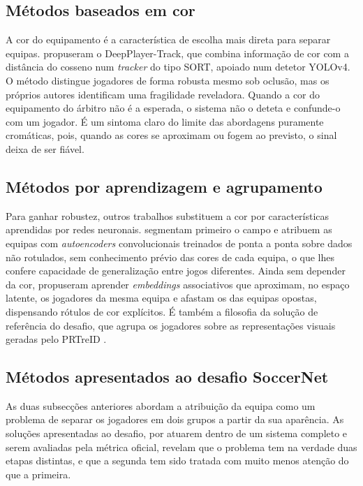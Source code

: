 \subsection{Métodos baseados em cor}

A cor do equipamento é a característica de escolha mais direta para separar equipas.
\citet{naik2022deepplayer} propuseram o DeepPlayer-Track, que combina informação de cor
com a distância do cosseno num \emph{tracker} do tipo SORT, apoiado num detetor YOLOv4.
O método distingue jogadores de forma robusta mesmo sob oclusão, mas os próprios autores
identificam uma fragilidade reveladora. Quando a cor do equipamento do árbitro não é a
esperada, o sistema não o deteta e confunde-o com um jogador. É um sintoma claro do
limite das abordagens puramente cromáticas, pois, quando as cores se aproximam ou fogem
ao previsto, o sinal deixa de ser fiável.

\subsection{Métodos por aprendizagem e agrupamento}

Para ganhar robustez, outros trabalhos substituem a cor por características aprendidas por
redes neuronais. \citet{alhejaily2023team} segmentam primeiro o campo e atribuem as
equipas com \emph{autoencoders} convolucionais treinados de ponta a ponta sobre dados não
rotulados, sem conhecimento prévio das cores de cada equipa, o que lhes confere capacidade
de generalização entre jogos diferentes. Ainda sem depender da cor,
\citet{istasse2019associative} propuseram aprender \emph{embeddings} associativos que
aproximam, no espaço latente, os jogadores da mesma equipa e afastam os das equipas
opostas, dispensando rótulos de cor explícitos. É também a filosofia da solução de
referência do desafio, que agrupa os jogadores sobre as representações visuais geradas
pelo PRTreID \citep{somers2024soccernet}.

\subsection{Métodos apresentados ao desafio SoccerNet}\label{sec:equipa-desafio}

As duas subsecções anteriores abordam a atribuição da equipa como um problema de separar os
jogadores em dois grupos a partir da sua aparência. As soluções apresentadas ao desafio, por
atuarem dentro de um sistema completo e serem avaliadas pela métrica oficial, revelam que o
problema tem na verdade duas etapas distintas, e que a segunda tem sido tratada com muito
menos atenção do que a primeira.

